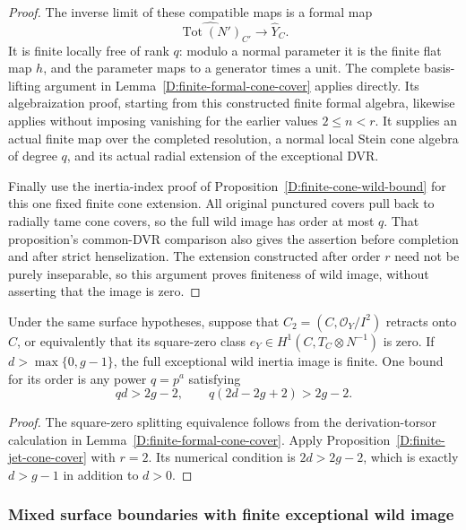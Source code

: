 \begin{proof}
The inverse limit of these compatible maps is a formal
map
\[
       \widehat{\operatorname{Tot}(N')}_{C'}
                     \longrightarrow\widehat Y_C.
\]
It is finite locally free of rank $q$: modulo a normal
parameter it is the finite flat map $h$, and the
parameter maps to a generator times a unit.  The
complete basis-lifting argument in
Lemma~\ref{D:finite-formal-cone-cover} applies directly.
Its algebraization proof, starting from this constructed
finite formal algebra, likewise applies without imposing
vanishing for the earlier values $2\leq n<r$.
It supplies an actual finite map over the completed
resolution, a normal local Stein cone algebra of
degree $q$, and its actual radial extension of the
exceptional DVR.

Finally use the inertia-index proof of
Proposition~\ref{D:finite-cone-wild-bound} for this one
fixed finite cone extension.  All original punctured
covers pull back to radially tame cone covers, so the
full wild image has order at most $q$.
That proposition's common-DVR comparison also gives
the assertion before completion and after strict
henselization.  The extension constructed after
order $r$ need not be purely inseparable, so this
argument proves finiteness of wild image, without
asserting that the image is zero.
\end{proof}

\begin{corollary}
\label{D:split-first-neighborhood-finite-wild}
Under the same surface hypotheses, suppose that
$C_2=(C,\mathcal O_Y/I^2)$ retracts onto $C$, or
equivalently that its square-zero class
$e_Y\in H^1(C,T_C\otimes N^{-1})$ is zero.
If $d>\max\{0,g-1\}$, the full exceptional wild
inertia image is finite.
One bound for its order is any power $q=p^a$ satisfying
\[
             qd>2g-2,\qquad q(2d-2g+2)>2g-2.
\]
\end{corollary}

\begin{proof}
The square-zero splitting equivalence follows from
the derivation-torsor calculation in
Lemma~\ref{D:finite-formal-cone-cover}.
Apply Proposition~\ref{D:finite-jet-cone-cover} with
$r=2$.  Its numerical condition is $2d>2g-2$,
which is exactly $d>g-1$ in addition to $d>0$.
\end{proof}

\subsubsection{Mixed surface boundaries with finite exceptional wild image}


